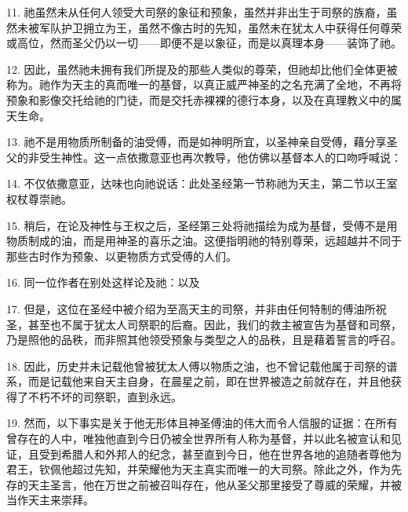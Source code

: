 11. 祂虽然未从任何人领受大司祭的象征和预象，虽然并非出生于司祭的族裔，虽然未被军队护卫拥立为王，虽然不像古时的先知，虽然未在犹太人中获得任何尊荣或高位，然而圣父仍以一切——即便不是以象征，而是以真理本身——装饰了祂。\par

12. 因此，虽然祂未拥有我们所提及的那些人类似的尊荣，但祂却比他们全体更被称为。祂作为天主的真而唯一的基督，以真正威严神圣的之名充满了全地，不再将预象和影像交托给祂的门徒，而是交托赤裸裸的德行本身，以及在真理教义中的属天生命。\par

13. 祂不是用物质所制备的油受傅，而是如神明所宜，以圣神亲自受傅，藉分享圣父的非受生神性。这一点依撒意亚也再次教导，他仿佛以基督本人的口吻呼喊说：\par

14. 不仅依撒意亚，达味也向祂说话：此处圣经第一节称祂为天主，第二节以王室权杖尊崇祂。\par

15. 稍后，在论及神性与王权之后，圣经第三处将祂描绘为成为基督，受傅不是用物质制成的油，而是用神圣的喜乐之油。这便指明祂的特别尊荣，远超越并不同于那些古时作为预象、以更物质方式受傅的人们。\par

16. 同一位作者在别处这样论及祂：以及\par

17. 但是，这位在圣经中被介绍为至高天主的司祭，并非由任何特制的傅油所祝圣，甚至也不属于犹太人司祭职的后裔。因此，我们的救主被宣告为基督和司祭，乃是照他的品秩，而非照其他领受预象与类型之人的品秩，且是藉着誓言的呼召。\par

18. 因此，历史并未记载他曾被犹太人傅以物质之油，也不曾记载他属于司祭的谱系，而是记载他来自天主自身，在晨星之前，即在世界被造之前就存在，并且他获得了不朽不坏的司祭职，直到永远。\par

19. 然而，以下事实是关于他无形体且神圣傅油的伟大而令人信服的证据：在所有曾存在的人中，唯独他直到今日仍被全世界所有人称为基督，并以此名被宣认和见证，且受到希腊人和外邦人的纪念，甚至直到今日，他在世界各地的追随者尊他为君王，钦佩他超过先知，并荣耀他为天主真实而唯一的大司祭。除此之外，作为先存的天主圣言，他在万世之前被召叫存在，他从圣父那里接受了尊威的荣耀，并被当作天主来崇拜。\par

